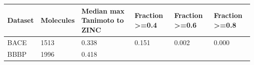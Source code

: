 \documentclass[
  10pt,
]{article}
\begin{document}
\begin{longtable}[]{@{}llllll@{}}
\toprule
\begin{minipage}[b]{0.14\columnwidth}\raggedright
Dataset\strut
\end{minipage} & \begin{minipage}[b]{0.14\columnwidth}\raggedright
Molecules\strut
\end{minipage} & \begin{minipage}[b]{0.14\columnwidth}\raggedright
Median max Tanimoto to ZINC\strut
\end{minipage} & \begin{minipage}[b]{0.14\columnwidth}\raggedright
Fraction \textgreater=0.4\strut
\end{minipage} & \begin{minipage}[b]{0.14\columnwidth}\raggedright
Fraction \textgreater=0.6\strut
\end{minipage} & \begin{minipage}[b]{0.14\columnwidth}\raggedright
Fraction \textgreater=0.8\strut
\end{minipage}\tabularnewline
\midrule
\endhead
\begin{minipage}[t]{0.14\columnwidth}\raggedright
BACE\strut
\end{minipage} & \begin{minipage}[t]{0.14\columnwidth}\raggedright
1513\strut
\end{minipage} & \begin{minipage}[t]{0.14\columnwidth}\raggedright
0.338\strut
\end{minipage} & \begin{minipage}[t]{0.14\columnwidth}\raggedright
0.151\strut
\end{minipage} & \begin{minipage}[t]{0.14\columnwidth}\raggedright
0.002\strut
\end{minipage} & \begin{minipage}[t]{0.14\columnwidth}\raggedright
0.000\strut
\end{minipage}\tabularnewline
\begin{minipage}[t]{0.14\columnwidth}\raggedright
BBBP\strut
\end{minipage} & \begin{minipage}[t]{0.14\columnwidth}\raggedright
1996\strut
\end{minipage} & \begin{minipage}[t]{0.14\columnwidth}\raggedright
0.418\strut
\end{minipage} & \begin{minipage}[t]{0.14\columnwidth}\raggedright

\end{minipage}
\end{longtable}
\end{document}
